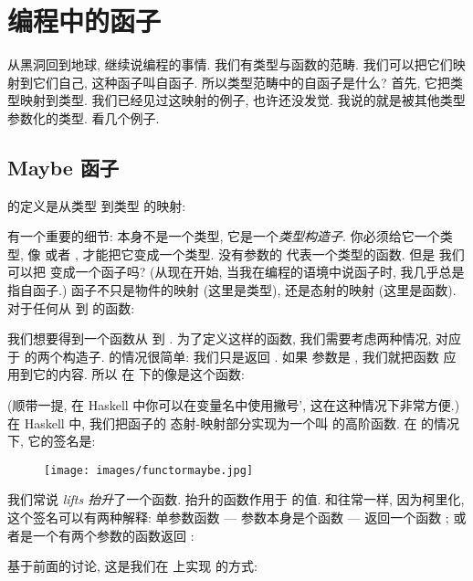 \section{编程中的函子}

从黑洞回到地球, 继续说编程的事情. 我们有类型与函数的范畴. 我们可以把它们映射到它们自己, 这种函子叫自函子.
所以类型范畴中的自函子是什么? 首先, 它把类型映射到类型. 我们已经见过这映射的例子, 也许还没发觉.
我说的就是被其他类型参数化的类型. 看几个例子.

\subsection{Maybe 函子}

 的定义是从类型  到类型  的映射:

有一个重要的细节:  本身不是一个类型, 它是一个\emph{类型构造子}. 你必须给它一个类型, 像
 或者 , 才能把它变成一个类型. 没有参数的  代表一个类型的函数. 但是
我们可以把  变成一个函子吗? (从现在开始, 当我在编程的语境中说函子时, 我几乎总是指自函子.)
函子不只是物件的映射 (这里是类型), 还是态射的映射 (这里是函数). 对于任何从  到  的函数:

我们想要得到一个函数从  到 . 为了定义这样的函数, 我们需要考虑两种情况,
对应于  的两个构造子.  的情况很简单: 我们只是返回 . 如果
参数是 , 我们就把函数  应用到它的内容. 所以  在  下的像是这个函数:

(顺带一提, 在 Haskell 中你可以在变量名中使用撇号', 这在这种情况下非常方便.) 在 Haskell 中, 我们把函子的
态射-映射部分实现为一个叫  的高阶函数. 在  的情况下, 它的签名是:


\begin{figure}[H]
  \centering
  \texttt{[image: images/functormaybe.jpg]}
\end{figure}

\noindent
我们常说  \emph{lifts 抬升}了一个函数. 抬升的函数作用于  的值. 和往常一样, 因为柯里化,
这个签名可以有两种解释: 单参数函数 --- 参数本身是个函数  --- 返回一个函数 ;
或者是一个有两个参数的函数返回 :

基于前面的讨论, 这是我们在  上实现  的方式:

